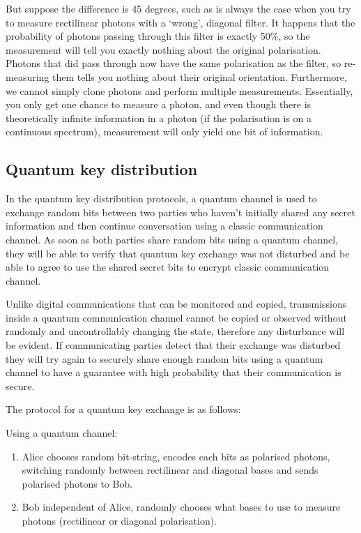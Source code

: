 \documentclass[oneside,a4paper]{article}
\begin{document}
But suppose the difference is 45 degrees, such as is always the case when you try to measure rectilinear photons with a `wrong', diagonal filter. 
It happens that the probability of photons passing through this filter is exactly 50\%, so the measurement will tell you exactly nothing about the original polarisation.
Photons that did pass through now have the same polarisation as the filter, so re-measuring them tells you nothing about their original orientation.
Furthermore, we cannot simply clone photons and perform multiple measurements.
Essentially, you only get one chance to measure a photon, and even though there is theoretically infinite information in a photon (if the polarisation is on a continuous spectrum), measurement will only yield one bit of information.

\subsection{Quantum key distribution}
In the quantum key distribution protocols, a quantum channel is used to exchange random bits between two parties who haven't initially shared any secret information and then continue conversation using a classic communication channel. As soon as both parties share random bits using a quantum channel, they will be able to verify that quantum key exchange was not disturbed and be able to agree to use the shared secret bits to encrypt classic communication channel.

Unlike digital communications that can be monitored and copied, transmissions inside a quantum communication channel cannot be copied or observed without randomly and uncontrollably changing the state, therefore any disturbance will be evident. If communicating parties detect that their exchange was disturbed they will try again to securely share enough random bits using a quantum channel to have a guarantee with high probability that their communication is secure.


The protocol for a quantum key exchange is as follows:

Using a quantum channel:
\begin{enumerate}
    \item Alice chooses random bit-string, encodes each bits as polarised photons, switching randomly between rectilinear and diagonal bases and sends polarised photons to Bob.
    \item Bob independent of Alice, randomly chooses what bases to use to measure photons (rectilinear or diagonal polarisation).
\end{enumerate}
\end{document}
